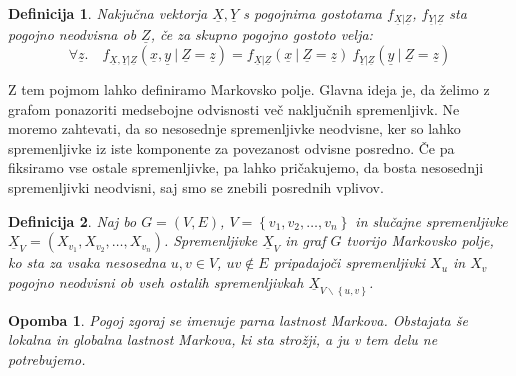 \documentclass[a4paper]{article}
\newtheorem{definition}{Definicija}[section]
\newtheorem*{opomba}{Opomba}
\begin{document}
	\begin{definition}
		Nakjučna vektorja $\underline{X}, \underline{Y}$ s pogojnima gostotama
		$f_{\underline{X}|\underline{Z}}$, $f_{\underline{Y}|\underline{Z}}$ sta pogojno
		neodvisna ob $\underline{Z}$, če za skupno pogojno gostoto velja:
		$$
		\forall \underline{z}. \quad
		f_{\underline{X}, \underline{Y}|\underline{Z}}\left(\underline{x}, \underline{y}\ |\ \underline{Z} = \underline{z}\right) =
		f_{\underline{X}|\underline{Z}}\left(\underline{x}\ |\ \underline{Z} = \underline{z}\right) \
		f_{\underline{Y}|\underline{Z}}\left(\underline{y}\ |\ \underline{Z} = \underline{z}\right)
		$$
	\end{definition}

	Z tem pojmom lahko definiramo Markovsko polje. Glavna ideja je, da želimo z
	grafom ponazoriti medsebojne odvisnosti več naključnih spremenljivk. Ne
	moremo zahtevati, da so nesosednje spremenljivke neodvisne, ker so
	lahko spremenljivke iz iste komponente za povezanost odvisne posredno.
	Če pa fiksiramo vse ostale spremenljivke, pa lahko pričakujemo, da bosta
	nesosednji spremenljivki neodvisni, saj smo se znebili posrednih vplivov.

	\begin{definition}
		Naj bo $G = \left(V, E\right)$, $V = \left\{v_1, v_2, \ldots, v_n\right\}$
		in slučajne spremenljivke $\underline{X}_V = \left(X_{v_1}, X_{v_2}, \ldots, X_{v_n}\right)$.
		Spremenljivke $\underline{X}_V$ in graf $G$ tvorijo \emph{Markovsko polje}, ko
		sta za vsaka nesosedna $u, v \in V$, $uv \notin E$ pripadajoči spremenljivki $X_u$ in $X_v$ pogojno neodvisni ob
		vseh ostalih spremenljivkah $\underline{X}_{V\backslash\left\{u, v\right\}}$.
	\end{definition}
	\begin{opomba}
		Pogoj zgoraj se imenuje parna lastnost Markova. Obstajata še lokalna in
		globalna lastnost Markova, ki sta strožji, a ju v tem delu ne potrebujemo.
	\end{opomba}
\end{document}
